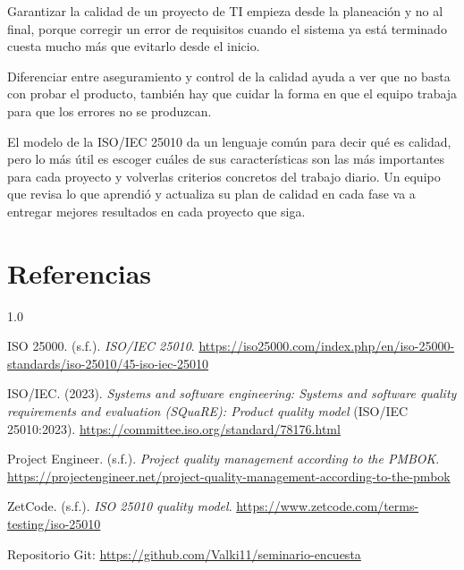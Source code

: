 \documentclass[12pt,letterpaper]{article}
\begin{document}
Garantizar la calidad de un proyecto de TI empieza desde la planeación y no al final, porque corregir un error de requisitos cuando el sistema ya está terminado cuesta mucho más que evitarlo desde el inicio.

Diferenciar entre aseguramiento y control de la calidad ayuda a ver que no basta con probar el producto, también hay que cuidar la forma en que el equipo trabaja para que los errores no se produzcan.

El modelo de la ISO/IEC 25010 da un lenguaje común para decir qué es calidad, pero lo más útil es escoger cuáles de sus características son las más importantes para cada proyecto y volverlas criterios concretos del trabajo diario. Un equipo que revisa lo que aprendió y actualiza su plan de calidad en cada fase va a entregar mejores resultados en cada proyecto que siga.

\section*{Referencias}

\begin{spacing}{1.0}
\small
\setlength{\parindent}{-1.27cm}
\setlength{\leftskip}{1.27cm}

ISO 25000. (s.f.). \textit{ISO/IEC 25010}. \url{https://iso25000.com/index.php/en/iso-25000-standards/iso-25010/45-iso-iec-25010}

ISO/IEC. (2023). \textit{Systems and software engineering: Systems and software quality requirements and evaluation (SQuaRE): Product quality model} (ISO/IEC 25010:2023). \url{https://committee.iso.org/standard/78176.html}

Project Engineer. (s.f.). \textit{Project quality management according to the PMBOK}. \url{https://projectengineer.net/project-quality-management-according-to-the-pmbok}

ZetCode. (s.f.). \textit{ISO 25010 quality model}. \url{https://www.zetcode.com/terms-testing/iso-25010}

\end{spacing}

\vspace{12pt}
\noindent\small Repositorio Git: \url{https://github.com/Valki11/seminario-encuesta}
\end{document}
